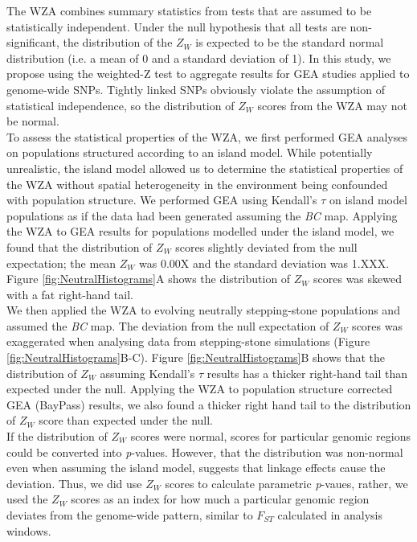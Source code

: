 \documentclass[10pt,twoside,lineno, twocolumn]{GSA_format}
\begin{document}
The WZA combines summary statistics from tests that are assumed to be statistically independent. Under the null hypothesis that all tests are non-significant, the distribution of the $Z_W$ is expected to be the standard normal distribution (i.e. a mean of 0 and a standard deviation of 1). In this study, we propose using the weighted-Z test to aggregate results for GEA studies applied to genome-wide SNPs. Tightly linked SNPs obviously violate the assumption of statistical independence, so the distribution of $Z_W$ scores from the WZA may not be normal. \\

To assess the statistical properties of the WZA, we first performed GEA analyses on populations structured according to an island model. While potentially unrealistic, the island model allowed us to determine the statistical properties of the WZA without spatial heterogeneity in the environment being confounded with population structure. We performed GEA using Kendall's $\tau$ on island model populations as if the data had been generated assuming the \textit{BC} map. Applying the WZA to GEA results for populations modelled under the island model, we found that the distribution of $Z_W$ scores slightly deviated from the null expectation; the mean $Z_W$ was 0.00X and the standard deviation was 1.XXX. Figure \ref{fig:NeutralHistograms}A shows the distribution of $Z_W$ scores was skewed with a fat right-hand tail.\\

We then applied the WZA to evolving neutrally stepping-stone populations and assumed the \textit{BC} map. The deviation from the null expectation of $Z_W$ scores was exaggerated when analysing data from stepping-stone simulations (Figure \ref{fig:NeutralHistograms}B-C). Figure \ref{fig:NeutralHistograms}B shows that the distribution of $Z_W$ assuming Kendall's $\tau$ results has a thicker right-hand tail than expected under the null. Applying the WZA to population structure corrected GEA (BayPass) results, we also found a thicker right hand tail to the distribution of $Z_W$ score than expected under the null. \\

If the distribution of $Z_W$ scores were normal, scores for particular genomic regions could be converted into \textit{p}-values. However, that the distribution was non-normal even when assuming the island model, suggests that linkage effects cause the deviation. Thus, we did use $Z_W$ scores to calculate parametric \textit{p}-vaues, rather, we used the $Z_W$ scores as an index for how much a particular genomic region deviates from the genome-wide pattern, similar to $F_{ST}$ calculated in analysis windows. \\
\end{document}
